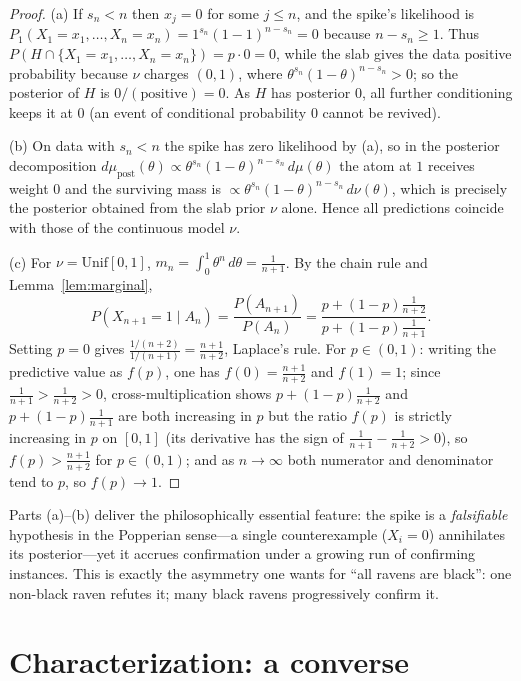 \documentclass{amsart}
\theoremstyle{definition}
\begin{document}
\begin{proof}
(a) If $s_n<n$ then $x_j=0$ for some $j\le n$, and the spike's likelihood is
$P_1(X_1=x_1,\dots,X_n=x_n)=1^{s_n}(1-1)^{n-s_n}=0$ because $n-s_n\ge1$. Thus
$P(H\cap\{X_1=x_1,\dots,X_n=x_n\})=p\cdot0=0$, while the slab gives the data
positive probability because $\nu$ charges $(0,1)$, where
$\theta^{s_n}(1-\theta)^{n-s_n}>0$; so the posterior of $H$ is
$0/(\text{positive})=0$. As $H$ has posterior $0$, all further conditioning keeps
it at $0$ (an event of conditional probability $0$ cannot be revived).

(b) On data with $s_n<n$ the spike has zero likelihood by (a), so in the
posterior decomposition
$d\mu_{\text{post}}(\theta)\propto\theta^{s_n}(1-\theta)^{n-s_n}\,d\mu(\theta)$
the atom at $1$ receives weight $0$ and the surviving mass is
$\propto\theta^{s_n}(1-\theta)^{n-s_n}\,d\nu(\theta)$, which is precisely the
posterior obtained from the slab prior $\nu$ alone. Hence all predictions
coincide with those of the continuous model $\nu$.

(c) For $\nu=\mathrm{Unif}[0,1]$, $m_n=\int_0^1\theta^n\,d\theta=\frac1{n+1}$.
By the chain rule and Lemma~\ref{lem:marginal},
\[
  P(X_{n+1}=1\mid A_n)=\frac{P(A_{n+1})}{P(A_n)}
  =\frac{p+(1-p)\frac{1}{n+2}}{p+(1-p)\frac{1}{n+1}} .
\]
Setting $p=0$ gives $\frac{1/(n+2)}{1/(n+1)}=\frac{n+1}{n+2}$, Laplace's rule.
For $p\in(0,1)$: writing the predictive value as $f(p)$, one has $f(0)=\frac{n+1}{n+2}$
and $f(1)=1$; since $\frac1{n+1}>\frac1{n+2}>0$, cross-multiplication shows
$p+(1-p)\frac1{n+2}$ and $p+(1-p)\frac1{n+1}$ are both increasing in $p$ but the
ratio $f(p)$ is strictly increasing in $p$ on $[0,1]$ (its derivative has the sign
of $\frac1{n+1}-\frac1{n+2}>0$), so $f(p)>\frac{n+1}{n+2}$ for $p\in(0,1)$; and
as $n\to\infty$ both numerator and denominator tend to $p$, so $f(p)\to1$.
\end{proof}

Parts (a)--(b) deliver the philosophically essential feature: the spike is a
\emph{falsifiable} hypothesis in the Popperian sense---a single counterexample
($X_i=0$) annihilates its posterior---yet it accrues confirmation under a
growing run of confirming instances. This is exactly the asymmetry one wants for
``all ravens are black'': one non-black raven refutes it; many black ravens
progressively confirm it.

\section{Characterization: a converse}\label{sec:converse}
\end{document}
